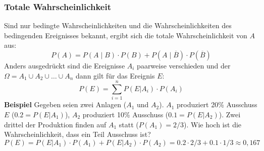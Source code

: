 

\subsubsection{Totale Wahrscheinlichkeit}
Sind nur bedingte Wahrscheinlichkeiten und die Wahrscheinlichkeiten des bedingenden Ereignisses bekannt, ergibt sich die totale Wahrscheinlichkeit von $A$ aus:
\begin{equation*}
	P(A) = P\left(A\mid B\right)\cdot P(B)+P\left(A\mid\overline B\right)\cdot P\left(\overline B\right)
\end{equation*}
Anders ausgedrückt sind die Ereignisse $A_i$ paarweise verschieden und der $\Omega = A_1 \cup A_2 \cup \dots \cup A_n$ dann gilt für das Ereignis $E$:
\begin{equation*}
	P(E) = \sum_{i=1}^n P(E | A_i) \cdot P(A_i)
\end{equation*}
\textbf{Beispiel} Gegeben seien zwei Anlagen ($A_1$ und $A_2$). $A_1$ produziert 20\% Ausschuss $E$ ($0.2 = P(E|A_1)$), $A_2$ produziert 10\% Ausschuss ($0.1 = P(E|A_2)$).
Zwei drittel der Produktion finden auf $A_1$ statt ($P(A_1) = 2/3$). Wie hoch ist die Wahrscheinlichkeit, dass ein Teil Ausschuss ist?
$P(E) = P(E|A_1) \cdot P(A_1) + P(E|A_2) \cdot P(A_2) = 0.2 \cdot 2/3 + 0.1 \cdot 1/3 \approx 0{,}167$

